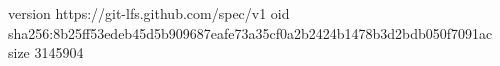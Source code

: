 version https://git-lfs.github.com/spec/v1
oid sha256:8b25ff53edeb45d5b909687eafe73a35cf0a2b2424b1478b3d2bdb050f7091ac
size 3145904
